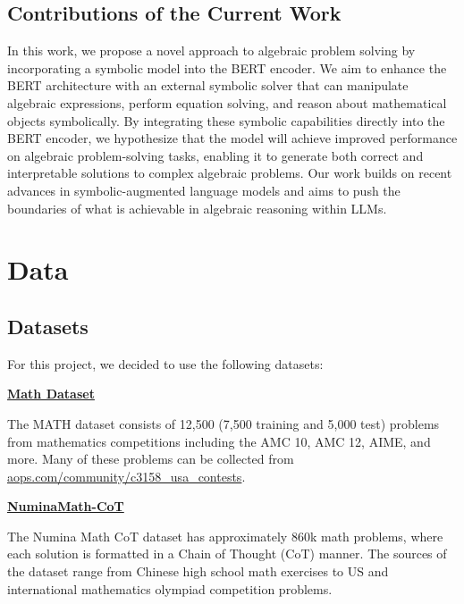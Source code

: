 \documentclass{article}
\begin{document}
\subsection{Contributions of the Current Work}

In this work, we propose a novel approach to algebraic problem solving by incorporating a symbolic model into the BERT encoder. We aim to enhance the BERT architecture with an external symbolic solver that can manipulate algebraic expressions, perform equation solving, and reason about mathematical objects symbolically. By integrating these symbolic capabilities directly into the BERT encoder, we hypothesize that the model will achieve improved performance on algebraic problem-solving tasks, enabling it to generate both correct and interpretable solutions to complex algebraic problems. Our work builds on recent advances in symbolic-augmented language models and aims to push the boundaries of what is achievable in algebraic reasoning within LLMs.


\section{Data}


\subsection{Datasets}

For this project, we decided to use the following datasets:

\href{https://www.kaggle.com/datasets/mathurinache/math-dataset}{{\bf Math Dataset}}

The MATH dataset consists of 12,500 (7,500 training and 5,000 test) problems from mathematics competitions including the AMC 10, AMC 12, AIME, and more. Many of these problems can be collected from \href{https://artofproblemsolving.com/community/c3158\_usa\_contests}{aops.com/community/c3158\_usa\_contests}.
\cite{hendrycksmath2021}

\href{https://huggingface.co/datasets/AI-MO/NuminaMath-CoT}{{\bf NuminaMath-CoT}}

The Numina Math CoT dataset has approximately 860k math problems, where each solution is formatted in a Chain of Thought (CoT) manner. The sources of the dataset range from Chinese high school math exercises to US and international mathematics olympiad competition problems.
\cite{numina_math_datasets_CoT}
\end{document}
